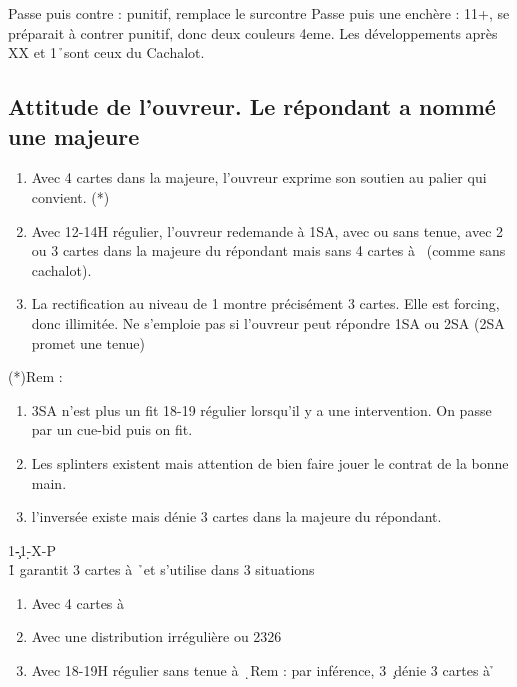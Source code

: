 \documentclass[a4paper]{article}
\begin{document}
Passe puis contre : punitif, remplace le surcontre
Passe puis une enchère : 11+, se préparait à contrer punitif, donc deux couleurs 4eme.
Les développements après XX et 1\h\ sont ceux du Cachalot.

\subsection{Attitude de l’ouvreur. Le répondant a 
nommé une majeure}

\begin{enumerate}
\item Avec 4 cartes dans la majeure, l’ouvreur exprime son soutien 
au palier qui convient. (*)

\item Avec 12-14H régulier, l’ouvreur redemande à 1SA, avec ou 
sans tenue, avec 2 ou 3 cartes dans la majeure du répondant 
mais sans 4 cartes à \s\ (comme sans cachalot).

\item La rectification au niveau de 1 montre précisément 3 cartes. 
Elle est forcing, donc illimitée. Ne s’emploie pas si l’ouvreur 
peut répondre 1SA ou 2SA (2SA promet une tenue)

\end{enumerate}

(*)Rem :

\begin{enumerate}
\item 3SA n’est plus un fit 18-19 régulier lorsqu’il y a une intervention. On passe
par un cue-bid puis on fit.

\item Les splinters existent mais attention de bien faire jouer le contrat de la 
bonne main.

\item l’inversée existe mais dénie 3 cartes dans la majeure du répondant.

\end{enumerate}

\begin{bidtable}
1\c-1\d-X-P\\
1\h \> garantit 3 cartes à \h\ et s’utilise dans 3 situations
\end{bidtable}

\begin{enumerate}
\item Avec 4 cartes à \s\ 

\item Avec une distribution irrégulière ou 2326

\item Avec 18-19H régulier sans tenue à \d\ 
Rem : par inférence, 3 \c\ dénie 3 cartes à \h 

\end{enumerate}
\end{document}
